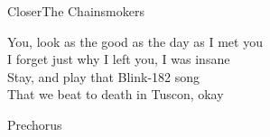 \begin{song}{Closer}{The Chainsmokers}
\begin{guitar}
You, look as the good as the day as I met you\\
I forget just why I left you, I was insane\\
Stay, and play that Blink-182 song\\
That we beat to death in Tuscon, okay\\
\end{guitar}

\begin{guitar}
Prechorus\\
\end{guitar}





\end{song}
